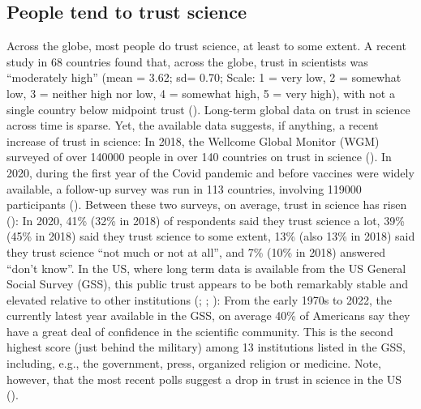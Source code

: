 \documentclass[
  jou,
  floatsintext,
  longtable,
  nolmodern,
  notxfonts,
  notimes,
  colorlinks=true,linkcolor=blue,citecolor=blue,urlcolor=blue]{apa7}
\begin{document}
\subsection{People tend to trust
science}\label{people-tend-to-trust-science}

Across the globe, most people do trust science, at least to some extent.
A recent study in 68 countries found that, across the globe, trust in
scientists was ``moderately high'' (mean = 3.62; sd= 0.70; Scale: 1 =
very low, 2 = somewhat low, 3 = neither high nor low, 4 = somewhat high,
5 = very high), with not a single country below midpoint trust
().
Long-term global data on trust in science across time is sparse. Yet,
the available data suggests, if anything, a recent increase of trust in
science: In 2018, the Wellcome Global Monitor (WGM) surveyed of over
140000 people in over 140 countries on trust in science
(). In 2020, during the first year of the Covid
pandemic and before vaccines were widely available, a follow-up survey
was run in 113 countries, involving 119000 participants
(). Between these two surveys, on average, trust in
science has risen
(): In 2020, 41\% (32\% in 2018) of respondents said
they trust science a lot, 39\% (45\% in 2018) said they trust science to
some extent, 13\% (also 13\% in 2018) said they trust science ``not much
or not at all'', and 7\% (10\% in 2018) answered ``don't know''. In the
US, where long term data is available from the US General Social Survey
(GSS), this public trust appears to be both remarkably stable and
elevated relative to other institutions
(;
; ): From the early 1970s to 2022, the currently latest year
available in the GSS, on average 40\% of Americans say they have a great
deal of confidence in the scientific community. This is the second
highest score (just behind the military) among 13 institutions listed in
the GSS, including, e.g., the government, press, organized religion or
medicine. Note, however, that the most recent polls suggest a drop in
trust in science in the US ().
\end{document}

